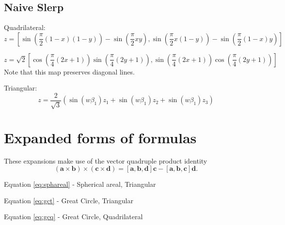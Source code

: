 \documentclass{amsart}[12pt]
\begin{document}
\subsection{Naive Slerp}

Quadrilateral:
\begin{equation}
z = \left[\sin\left(\frac{\pi}{2} (1-x)(1-y)\right)
- \sin\left(\frac{\pi}{2} x y\right),
\sin\left(\frac{\pi}{2} x (1-y)\right)
- \sin\left(\frac{\pi}{2} (1-x) y\right)\right]
\end{equation}

\begin{equation}
z = \sqrt 2 \left[\cos\left(\frac{\pi}{4} (2x+1)\right)
\sin\left(\frac{\pi}{4} (2y+1)\right),
\sin\left(\frac{\pi}{4} (2x+1)\right)
\cos\left(\frac{\pi}{4} (2y+1)\right)\right]
\end{equation}
Note that this map preserves diagonal lines.

Triangular:
\begin{equation}
z = \frac{2}{\sqrt 3} \left(\sin(w \beta_1 ) z_1 + \sin(w \beta_1 ) z_2 + \sin(w \beta_1 ) z_3\right)
\end{equation}

\section{Expanded forms of formulas}

These expansions make use of the vector quadruple product identity
\begin{equation}
(\mathbf a \times \mathbf b) \times (\mathbf c \times \mathbf d)
= [\mathbf a, \mathbf b, \mathbf d] \mathbf c
- [\mathbf a, \mathbf b, \mathbf c] \mathbf d.
\end{equation}

Equation \ref{eq:sphareal} - Spherical areal, Triangular

Equation \ref{eq:gct} - Great Circle, Triangular

Equation \ref{eq:gcq} - Great Circle, Quadrilateral

\end{document}
